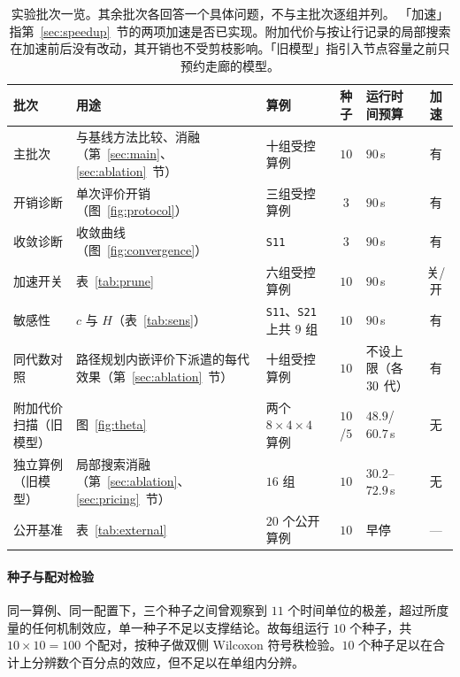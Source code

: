 \documentclass[manuscript,screen,review]{acmart}
\newcommand{\NCases}{10}
\newcommand{\NSeeds}{10}
\newcommand{\NPairs}{100}
\newcommand{\MatrixCells}{16}
\newcommand{\PubNInst}{20}
\begin{document}
\begin{table}[ht]
\caption{实验批次一览。其余批次各回答一个具体问题，不与主批次逐组并列。
「加速」指第~\ref{sec:speedup}~节的两项加速是否已实现。附加代价与按让行记录的局部搜索在加速前后没有改动，其开销也不受剪枝影响。「旧模型」指引入节点容量之前只预约走廊的模型。}
\label{tab:batches}
\footnotesize
\begin{tabular}{@{}p{1.7cm}p{2.3cm}p{1.9cm}cp{1.6cm}c@{}}
\toprule
批次 & 用途 & 算例 & 种子 & 运行时间预算 & 加速 \\
\midrule
主批次 & 与基线方法比较、消融（第~\ref{sec:main}、\ref{sec:ablation}~节） & 十组受控算例 & $\NSeeds$ & $90$\,s & 有 \\
开销诊断 & 单次评价开销（图~\ref{fig:protocol}） & 三组受控算例 & $3$ & $90$\,s & 有 \\
收敛诊断 & 收敛曲线（图~\ref{fig:convergence}） & \texttt{S11} & $3$ & $90$\,s & 有 \\
加速开关 & 表~\ref{tab:prune} & 六组受控算例 & $10$ & $90$\,s & 关/开 \\
敏感性 & $c$ 与 $H$（表~\ref{tab:sens}） & \texttt{S11}、\texttt{S21} 上共 $9$ 组 & $10$ & $90$\,s & 有 \\
同代数对照 & 路径规划内嵌评价下派遣的每代效果（第~\ref{sec:ablation}~节） & 十组受控算例 & $10$ & 不设上限（各 $30$ 代） & 有 \\
附加代价扫描（旧模型） & 图~\ref{fig:theta} & 两个 $8\times4\times4$ 算例 & $10$/$5$ & $48.9$/$60.7$\,s & 无 \\
独立算例（旧模型） & 局部搜索消融（第~\ref{sec:ablation}、\ref{sec:pricing}~节） & $\MatrixCells$ 组 & $10$ & $30.2$--$72.9$\,s & 无 \\
公开基准 & 表~\ref{tab:external} & $\PubNInst$ 个公开算例 & $\NSeeds$ & 早停 & --- \\
\bottomrule
\end{tabular}
\end{table}

\paragraph{种子与配对检验}
同一算例、同一配置下，三个种子之间曾观察到 $11$ 个时间单位的极差，超过所度量的任何机制效应，单一种子不足以支撑结论。故每组运行 $\NSeeds$ 个种子，共 $\NCases\times\NSeeds=\NPairs$ 个配对，按种子做双侧 Wilcoxon 符号秩检验。$\NSeeds$ 个种子足以在合计上分辨数个百分点的效应，但不足以在单组内分辨。
\end{document}
